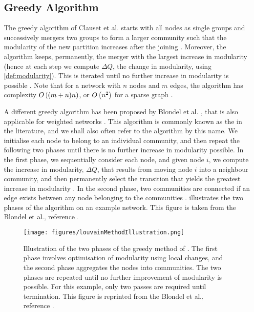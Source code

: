 
\subsection{Greedy Algorithm}
\label{subsec:greedyAlgorithm}

The greedy algorithm of Clauset et al. \cite{CNM04} starts with all nodes as single groups and successively mergers two groups to form a larger community such that the modularity of the new partition increases after the joining \cite{CNM04,For10}.
Moreover, the algorithm keeps, permanently, the merger with the largest increase in modularity (hence at each step we compute $\Delta Q$, the change in modularity, using \cref{def:modularity}).
This is iterated until no further increase in modularity is possible \cite{CNM04}.
Note that for a network with $n$ nodes and $m$ edges, the algorithm has complexity $O\left((m+n)n\right)$, or $O\left(n^{2}\right)$ for a sparse graph \cite{For10}.

A different greedy algorithm has been proposed by Blondel et al. \cite{BGL+08}, that is also applicable for weighted networks \cite{For10}.
This algorithm is commonly known as the  in the literature, and we shall also often refer to the algorithm by this name.
We initialise each node to belong to an individual community, and then repeat the following two phases until there is no further increase in modularity possible.
In the first phase, we sequentially consider each node, and given node $i$, we compute the increase in modularity, $\Delta Q$, that results from moving node $i$ into a neighbour community, and then permanently select the transition that yields the greatest increase in modularity \cite{BGL+08,For10}.
In the second phase, two communities are connected if an edge exists between any node belonging to the communities \cite{BGL+08,For10}.
 illustrates the two phases of the algorithm on an example network. This figure is taken from the Blondel et al., reference \cite{BGL+08}.

\begin{figure}
	\centering
	\texttt{[image: figures/louvainMethodIllustration.png]}
	\caption[Illustration of greedy algorithm for modularity optimisation.]{\label{fig:LouvainMethodIllustration} Illustration of the two phases of the greedy method of \cite{BGL+08}. The first phase involves optimisation of modularity using local changes, and the second phase aggregates the nodes into communities. The two phases are repeated until no further improvement of modularity is possible. For this example, only two passes are required until termination. This figure is reprinted from the Blondel et al., reference \cite{BGL+08}.}
\end{figure}

